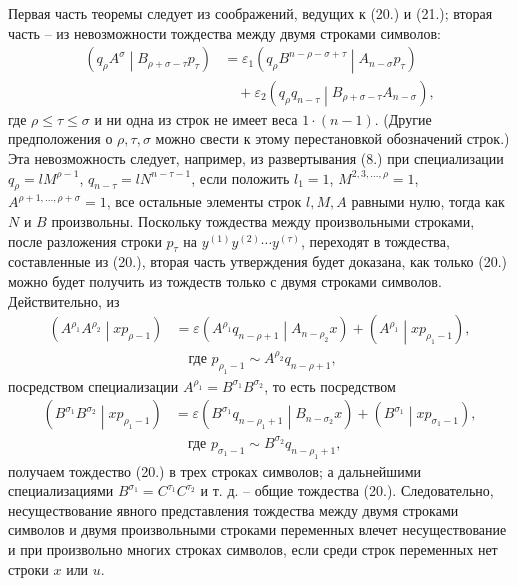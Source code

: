 \documentclass[11pt]{article}
\newcommand{\pair}[2]{\left(#1\middle|#2\right)}
\newcommand{\eps}{\varepsilon}
\begin{document}
Первая часть теоремы следует из соображений, ведущих к (20.) и (21.); вторая часть -- из невозможности тождества между двумя строками символов:
\[
\begin{aligned}
\pair{q_\rho A^\sigma}{B_{\rho+\sigma-\tau}p_\tau}
&=\eps_1\pair{q_\rho B^{n-\rho-\sigma+\tau}}{A_{n-\sigma}p_\tau}\\
&\quad+\eps_2\pair{q_\rho q_{n-\tau}}{B_{\rho+\sigma-\tau}A_{n-\sigma}},
\end{aligned}
\]
где $\rho\le\tau\le\sigma$ и ни одна из строк не имеет веса $1\cdot(n-1)$. (Другие предположения о $\rho,\tau,\sigma$ можно свести к этому перестановкой обозначений строк.) Эта невозможность следует, например, из развертывания (8.) при специализации $q_\rho=lM^{\rho-1}$, $q_{n-\tau}=lN^{n-\tau-1}$, если положить $l_1=1$, $M^{2,3,\ldots,\rho}=1$, $A^{\rho+1,\ldots,\rho+\sigma}=1$, все остальные элементы строк $l,M,A$ равными нулю, тогда как $N$ и $B$ произвольны. Поскольку тождества между произвольными строками, после разложения строки $p_\tau$ на $y^{(1)}y^{(2)}\cdots y^{(\tau)}$, переходят в тождества, составленные из (20.), вторая часть утверждения будет доказана, как только (20.) можно будет получить из тождеств только с двумя строками символов. Действительно, из
\begin{equation}
\begin{aligned}
\pair{A^{\rho_1}A^{\rho_2}}{xp_{\rho-1}}
&=\eps\pair{A^{\rho_1}q_{n-\rho+1}}{A_{n-\rho_2}x}
+\pair{A^{\rho_1}}{xp_{\rho_1-1}},\\
&\quad \text{где }p_{\rho_1-1}\sim A^{\rho_2}q_{n-\rho+1},
\end{aligned}
\tag{20a}
\end{equation}
посредством специализации $A^{\rho_1}=B^{\sigma_1}B^{\sigma_2}$, то есть посредством
\[
\begin{aligned}
\pair{B^{\sigma_1}B^{\sigma_2}}{xp_{\rho_1-1}}
&=\eps\pair{B^{\sigma_1}q_{n-\rho_1+1}}{B_{n-\sigma_2}x}
+\pair{B^{\sigma_1}}{xp_{\sigma_1-1}},\\
&\quad \text{где } p_{\sigma_1-1}\sim B^{\sigma_2}q_{n-\rho_1+1},
\end{aligned}
\]
получаем тождество (20.) в трех строках символов; а дальнейшими специализациями $B^{\sigma_1}=C^{\tau_1}C^{\tau_2}$ и т. д. -- общие тождества (20.). Следовательно, несуществование явного представления тождества между двумя строками символов и двумя произвольными строками переменных влечет несуществование и при произвольно многих строках символов, если среди строк переменных нет строки $x$ или $u$.
\end{document}
